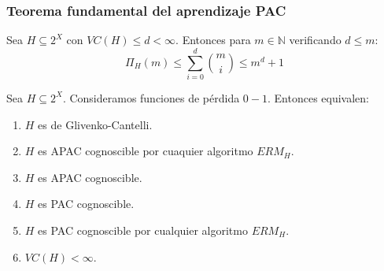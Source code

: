 \begin{frame}\frametitle{Teorema fundamental del aprendizaje PAC}
 \begin{lemma}
  Sea $H \subseteq 2^X$ con $VC(H) \le d < \infty$. Entonces para $m\in \mathbb{N}$ verificando $d\le m$:
  \[
    \Pi_{H} (m) \le \sum_{i=0}^d \binom{m}{i} \le m^d + 1
  \]
 \end{lemma}
 
 \begin{theorem}
  Sea $H\subseteq 2^X$. Consideramos funciones de pérdida $0-1$. Entonces equivalen:
  \begin{enumerate}[i]
  \item \label{th:fundi} $H$ es de Glivenko-Cantelli.
  \item \label{th:fundii} $H$ es APAC cognoscible por cuaquier algoritmo $ERM_H$.
  \item \label{th:fundiii} $H$ es APAC cognoscible.
  \item \label{th:fundiv} $H$ es PAC cognoscible.
  \item \label{th:fundv} $H$ es PAC cognoscible por cualquier algoritmo $ERM_H$.
  \item \label{th:fundvi} $VC (H) < \infty$.
  \end{enumerate}
 \end{theorem}
\end{frame}


